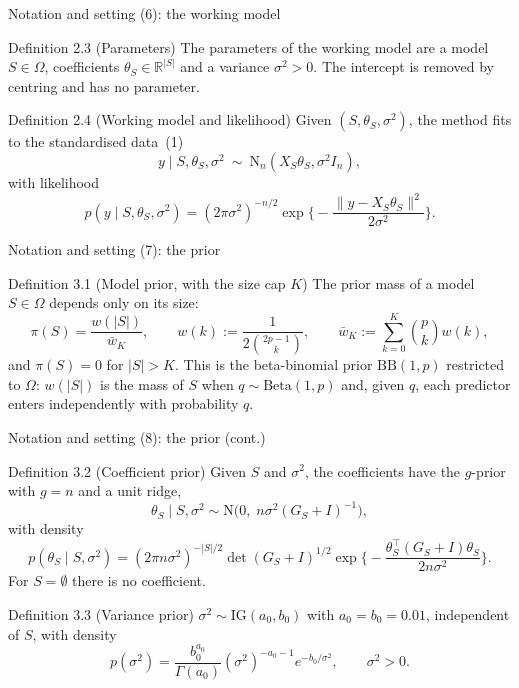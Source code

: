 \documentclass[aspectratio=169]{beamer}
\newcommand{\R}{\mathbb{R}}
\newcommand{\abs}[1]{\lvert #1\rvert}
\newcommand{\norm}[1]{\lVert #1\rVert}
\newcommand{\Normal}{\mathrm{N}}
\newcommand{\IG}{\mathrm{IG}}
\newcommand{\BetaDist}{\mathrm{Beta}}
\newcommand{\BB}{\mathrm{BB}}
\newcommand{\Om}{\Omega}
\begin{document}
\begin{frame}{Notation and setting (6): the working model}
\footnotesize
\begin{block}{Definition 2.3 (Parameters)}
The parameters of the working model are a model $S\in\Om$, coefficients $\theta_S\in\R^{\abs{S}}$ and a variance
$\sigma^2>0$. The intercept is removed by centring and has no parameter.
\end{block}
\begin{block}{Definition 2.4 (Working model and likelihood)}
Given $(S,\theta_S,\sigma^2)$, the method fits to the standardised data~\textup{(1)}
\[
  y\mid S,\theta_S,\sigma^2\ \sim\ \Normal_n(X_S\theta_S,\sigma^2I_n),
\]
with likelihood
\begin{equation}\tag{4}
  p(y\mid S,\theta_S,\sigma^2)=(2\pi\sigma^2)^{-n/2}\exp\Big\{-\frac{\norm{y-X_S\theta_S}^2}{2\sigma^2}\Big\}.
\end{equation}
\end{block}
\end{frame}

\begin{frame}{Notation and setting (7): the prior}
\footnotesize
\begin{block}{Definition 3.1 (Model prior, with the size cap $K$)}
The prior mass of a model $S\in\Om$ depends only on its size:
\begin{equation}\tag{5}
  \pi(S)=\frac{w(\abs{S})}{\bar w_K},\qquad w(k):=\frac{1}{2\binom{2p-1}{k}},\qquad
  \bar w_K:=\sum_{k=0}^{K}\binom{p}{k}w(k),
\end{equation}
and $\pi(S)=0$ for $\abs{S}>K$. This is the beta-binomial prior $\BB(1,p)$ restricted to $\Om$: $w(\abs{S})$ is the mass
of $S$ when $q\sim\BetaDist(1,p)$ and, given $q$, each predictor enters independently with probability $q$.
\end{block}
\end{frame}

\begin{frame}{Notation and setting (8): the prior (cont.)}
\footnotesize
\begin{block}{Definition 3.2 (Coefficient prior)}
Given $S$ and $\sigma^2$, the coefficients have the $g$-prior with $g=n$ and a unit ridge,
\begin{equation}\tag{6}
  \theta_S\mid S,\sigma^2\sim\Normal\big(0,\;n\sigma^2(G_S+I)^{-1}\big),
\end{equation}
with density
\[
  p(\theta_S\mid S,\sigma^2)=(2\pi n\sigma^2)^{-\abs{S}/2}\det(G_S+I)^{1/2}
  \exp\Big\{-\frac{\theta_S^\top(G_S+I)\theta_S}{2n\sigma^2}\Big\}.
\]
For $S=\emptyset$ there is no coefficient.
\end{block}
\begin{block}{Definition 3.3 (Variance prior)}
$\sigma^2\sim\IG(a_0,b_0)$ with $a_0=b_0=0.01$, independent of $S$, with density
\[
  p(\sigma^2)=\frac{b_0^{a_0}}{\Gamma(a_0)}(\sigma^2)^{-a_0-1}e^{-b_0/\sigma^2},\qquad \sigma^2>0 .
\]
\end{block}
\end{frame}
\end{document}
